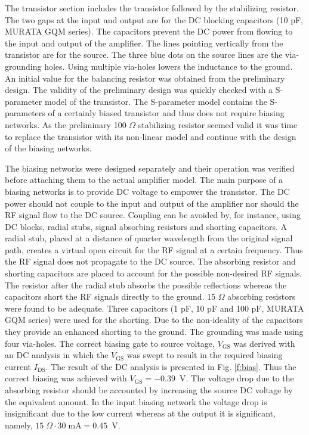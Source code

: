 \documentclass[a4paper, 12pt]{article}
\begin{document}
The transistor section includes the transistor followed by the stabilizing resistor. 
The two gaps at the input and output are for the DC blocking capacitors (10 pF, MURATA GQM series). 
The capacitors prevent the DC power from flowing to the input and output of the amplifier. 
The lines pointing vertically from the transistor are for the source. The three blue dots
on the source lines are the via-grounding holes. Using multiple via-holes lowers the inductance 
to the ground. An initial value for the balancing resistor was obtained from the preliminary 
design. The validity of the preliminary design was quickly checked with a S-parameter model 
of the transistor. The S-parameter model contains the S-parameters of a certainly biased 
transistor and thus does not require biasing networks. As the preliminary 100 $\Omega$ 
stabilizing resistor seemed valid it was time to replace the transistor with its non-linear 
model and continue with the design of the biasing networks. 

The biasing networks were designed separately and their operation was verified before attaching 
them to the actual amplifier model. The main purpose of a biasing networks is to provide DC 
voltage to empower the transistor. The DC power should not couple to the input and output of 
the amplifier nor should the RF signal flow to the DC source. Coupling can be avoided by, for 
instance, using DC blocks, radial stubs, signal absorbing resistors and shorting capacitors. 
A radial stub, placed at a distance of quarter wavelength from the original signal path, creates 
a virtual open circuit for the RF signal at a certain frequency. Thus the RF signal does not 
propagate to the DC source. The absorbing resistor and shorting capacitors are placed to account 
for the possible non-desired RF signals. The  resistor after the radial stub absorbs the possible 
reflections whereas the capacitors short the RF signals directly to the ground. 15 $\Omega$ 
absorbing resistors were found to be adequate. Three capacitors (1 pF, 10 pF and 100 pF, MURATA 
GQM series) were used for the shorting. Due to the non-ideality of the capacitors they provide 
an enhanced shorting to the ground. The grounding was made using four via-holes. The correct 
biasing gate to source voltage, $V_\mathrm{GS}$ was derived with an DC analysis in which the 
$V_\mathrm{GS}$ was swept to result in the required biasing current $I_\mathrm{DS}$. The 
result of the DC analysis is presented in Fig. \ref{f:bias}. Thus the correct biasing 
was achieved with $V_\mathrm{GS} = -0.39$~V. The voltage drop due to the absorbing 
resistor should be accounted by increasing the source DC voltage by the equivalent amount. In 
the input biasing network the voltage drop is insignificant due to the low current whereas at 
the output it is significant, namely, $15 \; \Omega \cdot 30 \; \mathrm{mA} = 0.45$~V.
\end{document}
